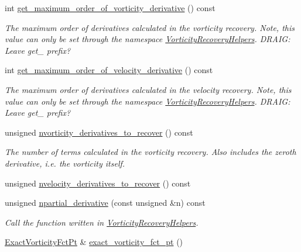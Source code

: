 \begin{DoxyCompactItemize}
int \hyperlink{classoomph_1_1VorticitySmootherElement_aad7f79c7cf34ceeb090153881b070f1f}{get\+\_\+maximum\+\_\+order\+\_\+of\+\_\+vorticity\+\_\+derivative} () const
\begin{DoxyCompactList}\small\item\em The maximum order of derivatives calculated in the vorticity recovery. Note, this value can only be set through the namespace \hyperlink{namespaceVorticityRecoveryHelpers}{Vorticity\+Recovery\+Helpers}. D\+R\+A\+IG\+: Leave get\+\_\+ prefix? \end{DoxyCompactList}\item 
int \hyperlink{classoomph_1_1VorticitySmootherElement_a019761da9b0b46ef3c4b6197b93fbfbc}{get\+\_\+maximum\+\_\+order\+\_\+of\+\_\+velocity\+\_\+derivative} () const
\begin{DoxyCompactList}\small\item\em The maximum order of derivatives calculated in the velocity recovery. Note, this value can only be set through the namespace \hyperlink{namespaceVorticityRecoveryHelpers}{Vorticity\+Recovery\+Helpers}. D\+R\+A\+IG\+: Leave get\+\_\+ prefix? \end{DoxyCompactList}\item 
unsigned \hyperlink{classoomph_1_1VorticitySmootherElement_a7a433092a73a9fed26330e247a415414}{nvorticity\+\_\+derivatives\+\_\+to\+\_\+recover} () const
\begin{DoxyCompactList}\small\item\em The number of terms calculated in the vorticity recovery. Also includes the zeroth derivative, i.\+e. the vorticity itself. \end{DoxyCompactList}\item 
unsigned \hyperlink{classoomph_1_1VorticitySmootherElement_abfa785cee70e98c2e1890a1d2053abba}{nvelocity\+\_\+derivatives\+\_\+to\+\_\+recover} () const
\item 
unsigned \hyperlink{classoomph_1_1VorticitySmootherElement_a24820e11328d5c4a87eb6fc8399e2a54}{npartial\+\_\+derivative} (const unsigned \&n) const
\begin{DoxyCompactList}\small\item\em Call the function written in \hyperlink{namespaceVorticityRecoveryHelpers}{Vorticity\+Recovery\+Helpers}. \end{DoxyCompactList}\item 
\hyperlink{classoomph_1_1VorticitySmootherElement_ad4ed9d81ba7718bf747e0abdd41cdaa1}{Exact\+Vorticity\+Fct\+Pt} \& \hyperlink{classoomph_1_1VorticitySmootherElement_acf41507313bc7171bdaf0f579ab25dd7}{exact\+\_\+vorticity\+\_\+fct\+\_\+pt} ()

\end{DoxyCompactItemize}
